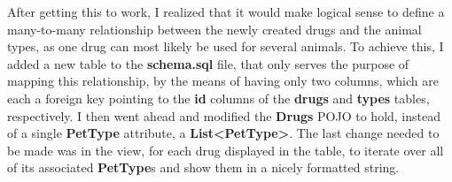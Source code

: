 \documentclass[12pt, a4paper]{article}
\begin{document}
After getting this to work, I realized that it would make logical sense to define a many-to-many relationship between the newly created drugs and the animal types, as one drug can most likely be used for several animals. To achieve this, I added a new table to the \textbf{schema.sql} file, that only serves the purpose of mapping this relationship, by the means of having only two columns, which are each a foreign key pointing to the \textbf{id} columns of the \textbf{drugs} and \textbf{types} tables, respectively. I then went ahead and modified the \textbf{Drugs} POJO to hold, instead of a single \textbf{PetType} attribute, a \textbf{List<PetType>}. The last change needed to be made was in the view, for each drug displayed in the table, to iterate over all of its associated \textbf{PetType}s and show them in a nicely formatted string.
\end{document}
